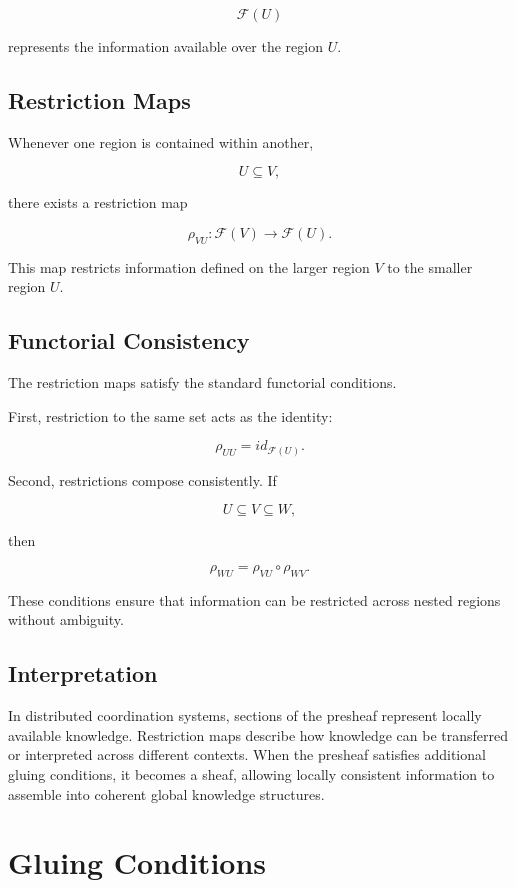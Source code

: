 \documentclass[12pt]{article}
\begin{document}
\[
\mathcal{F}(U)
\]

represents the information available over the region $U$.

\subsection{Restriction Maps}

Whenever one region is contained within another,

\[
U \subseteq V,
\]

there exists a restriction map

\[
\rho_{VU} : \mathcal{F}(V) \rightarrow \mathcal{F}(U).
\]

This map restricts information defined on the larger region $V$ to the smaller region $U$.

\subsection{Functorial Consistency}

The restriction maps satisfy the standard functorial conditions.

First, restriction to the same set acts as the identity:

\[
\rho_{UU} = id_{\mathcal{F}(U)}.
\]

Second, restrictions compose consistently. If

\[
U \subseteq V \subseteq W,
\]

then

\[
\rho_{WU} = \rho_{VU} \circ \rho_{WV}.
\]

These conditions ensure that information can be restricted across nested regions without ambiguity.

\subsection{Interpretation}

In distributed coordination systems, sections of the presheaf represent locally available knowledge. Restriction maps describe how knowledge can be transferred or interpreted across different contexts. When the presheaf satisfies additional gluing conditions, it becomes a sheaf, allowing locally consistent information to assemble into coherent global knowledge structures.

\section{Gluing Conditions}
\end{document}

